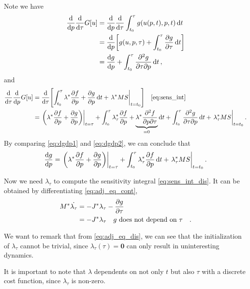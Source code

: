 \documentclass[a4paper,9pt]{article}
\theoremstyle{definition}
\theoremstyle{remark}
\begin{document}
Note we have
\begin{align}
  \dv{p} \dv{\tau} G[u] &= \dv{p} \dv{\tau} \int_{t_0}^{\tau} g(u(p, t), p, t) \dd{t} \\
                        &= \dv{p}\qty[g(u, p, \tau) + \int_{t_0}^{\tau}
                        \pdv{g}{\tau} \dd{t}] \\
                        &= \dv{g}{p} + \int_{t_0}^{\tau}
                        \pdv{g}{\tau}{p} \dd{t}, \label{eq:dgdp1}
\end{align}
and
\begin{align}
  \dv{\tau} \dv{p} G[u] &= \dv{\tau} \qty[\int_{t_0}^{\tau} \lambda^* \pdv{f}{p} +
  \pdv{g}{p} \dd{t} + \eval{\lambda^* MS}_{t=t_0}] \qq{\cref{eq:sens_int}}\\
                        &= \eval{\qty(\lambda^* \pdv{f}{p} + \pdv{g}{p})}_{t=\tau} +
                        \int_{t_0}^\tau \lambda_\tau^* \pdv{f}{p} +
                        \underbrace{\lambda^* \pdv{f}{p}{\tau}}_{=0}\dd{t}
                        + \int_{t_0}^\tau \pdv{g}{\tau}{p} \dd{t} +
                        \eval{\lambda_\tau^* MS}_{t=t_0}. \label{eq:dgdp2}
\end{align}
By comparing \cref{eq:dgdp1} and \cref{eq:dgdp2}, we can conclude that
\begin{equation} \label{eq:sens_int_dis}
  \dv{g}{p} = \eval{\qty(\lambda^* \pdv{f}{p} + \pdv{g}{p})}_{t=\tau} +
  \int_{t_0}^\tau \lambda_\tau^* \pdv{f}{p} \dd{t} +
  \eval{\lambda_\tau^* MS}_{t=t_0}.
\end{equation}

Now we need $\lambda_\tau$ to compute the sensitivity integral
\cref{eq:sens_int_dis}. It can be obtained by differentiating
\cref{eq:adj_eq_cont},
\begin{align}
  M^*\dot{\lambda_\tau} &= -J^* \lambda_\tau - \pdv{g}{\tau} \\
                               &= -J^* \lambda_\tau \qq{$g$ does not
                               depend on $\tau$}. \label{eq:adj_eq_dis}
\end{align}

We want to remark that from \cref{eq:adj_eq_dis}, we can see that the
initialization of $\lambda_\tau$ cannot be trivial, since
$\lambda_\tau(\tau) = \bm{0}$ can only result in uninteresting dynamics.

It is important to note that $\lambda$ dependents on not only $t$ but also
$\tau$ with a discrete cost function, since $\lambda_\tau$ is non-zero.
\end{document}

